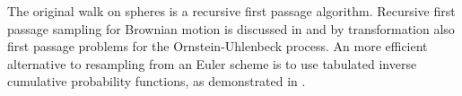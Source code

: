 \documentclass[a4paper,12pt]{article}
\begin{document}


\begin{related}
  The original walk on spheres is a recursive first passage algorithm.
  Recursive first passage sampling for
  Brownian motion is discussed in \cite{herrmann_first-passage_2016}
  and by transformation also first passage problems for the
  Ornstein-Uhlenbeck process.
  An more efficient alternative to resampling from an Euler scheme is to use tabulated
  inverse cumulative probability functions,
  as demonstrated in \cite{hwang_simulationtabulation_2001}.
\end{related}




\end{document}
